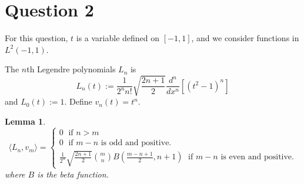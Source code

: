 \documentclass[10pt]{article}
\newtheorem{lemma}[theorem]{Lemma}
\newenvironment{definition}[1][Definition]{\begin{trivlist}
\item[\hskip \labelsep {\bfseries #1}]}{\end{trivlist}}
\begin{document}
    \section*{Question 2}
    For this question, $t$ is a variable defined on $[-1,1]$, and we consider
    functions in $L^2(-1,1)$.
        \begin{definition}
            The $n$th Legendre polynomials $L_n$ is
            \begin{equation*}
                L_n(t) := \frac{1}{2^n n!}\sqrt{\frac{2n+1}{2}}\frac{d^n}{dx^n}[(t^2-1)^n]
            \end{equation*}
            and $L_0(t) := 1$.
            Define $v_n(t) = t^n$.
        \end{definition}
        
        \begin{lemma}
            \label{innerProduct}
            \begin{equation*}
                \langle L_n,v_m\rangle  = \begin{cases}
                    0\;\text{ if }n>m\\
                    0\;\text{ if }m-n\text{ is odd and positive.}\\
                    \frac{1}{2^n} \sqrt{\frac{2n+1}{2}}{m\choose n}B(\frac{m-n+1}{2},n+1)\;\text{ if }m-n\text{ is even and positive.}
                \end{cases}
            \end{equation*}
               where $B$ is the beta function.
        \end{lemma}
\end{document}
